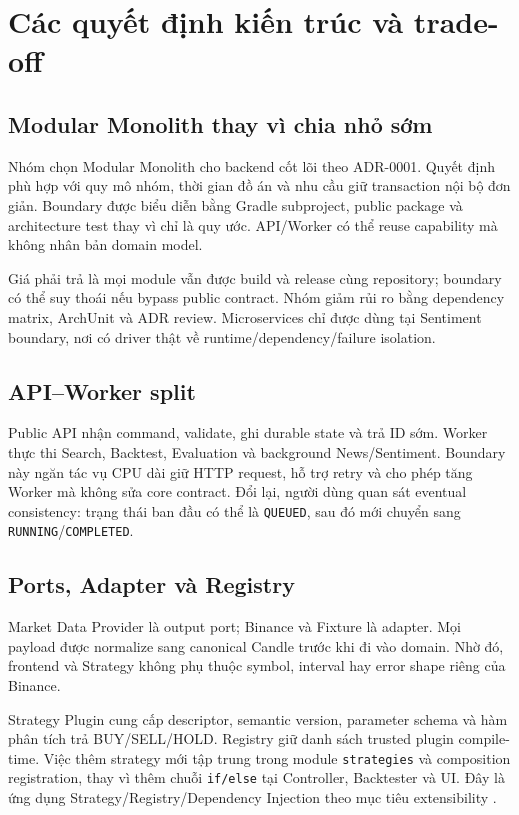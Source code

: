 \documentclass[12pt,a4paper,oneside]{report}
\begin{document}
\chapter{Các quyết định kiến trúc và trade-off}
\label{chap:decisions}

\section{Modular Monolith thay vì chia nhỏ sớm}

Nhóm chọn Modular Monolith cho backend cốt lõi theo ADR-0001. Quyết định phù hợp với quy mô nhóm, thời gian đồ án và nhu cầu giữ transaction nội bộ đơn giản. Boundary được biểu diễn bằng Gradle subproject, public package và architecture test thay vì chỉ là quy ước. API/Worker có thể reuse capability mà không nhân bản domain model.

Giá phải trả là mọi module vẫn được build và release cùng repository; boundary có thể suy thoái nếu bypass public contract. Nhóm giảm rủi ro bằng dependency matrix, ArchUnit và ADR review. Microservices chỉ được dùng tại Sentiment boundary, nơi có driver thật về runtime/dependency/failure isolation.

\section{API--Worker split}

Public API nhận command, validate, ghi durable state và trả ID sớm. Worker thực thi Search, Backtest, Evaluation và background News/Sentiment. Boundary này ngăn tác vụ CPU dài giữ HTTP request, hỗ trợ retry và cho phép tăng Worker mà không sửa core contract. Đổi lại, người dùng quan sát eventual consistency: trạng thái ban đầu có thể là \texttt{QUEUED}, sau đó mới chuyển sang \texttt{RUNNING}/\texttt{COMPLETED}.

\section{Ports, Adapter và Registry}

Market Data Provider là output port; Binance và Fixture là adapter. Mọi payload được normalize sang canonical Candle trước khi đi vào domain. Nhờ đó, frontend và Strategy không phụ thuộc symbol, interval hay error shape riêng của Binance.

Strategy Plugin cung cấp descriptor, semantic version, parameter schema và hàm phân tích trả BUY/SELL/HOLD. Registry giữ danh sách trusted plugin compile-time. Việc thêm strategy mới tập trung trong module \texttt{strategies} và composition registration, thay vì thêm chuỗi \texttt{if/else} tại Controller, Backtester và UI. Đây là ứng dụng Strategy/Registry/Dependency Injection theo mục tiêu extensibility \cite{gamma1994}.
\end{document}
